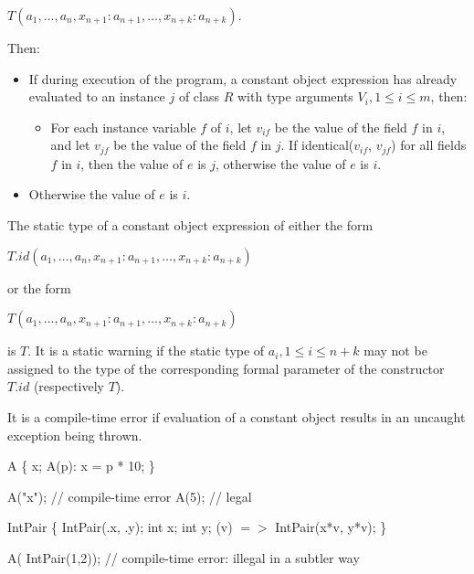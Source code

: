 \documentclass{article}
\newcommand{\code}[1]{{\sf #1}}
\begin{document}
\NEW{} $T(a_1, \ldots , a_n, x_{n+1}: a_{n+1}, \ldots , x_{n+k}: a_{n+k})$. 

\LMHash{}
Then:
\begin{itemize}
\item If during execution of the program, a constant object expression has already evaluated to an instance $j$ of class $R$ with type arguments $V_i, 1 \le i \le m$, then: 
\begin{itemize}
\item For each instance variable $f$ of $i$, let $v_{if}$ be the value of the field $f$ in $i$, and let $v_{jf}$ be the value of the field $f$ in $j$. If  \code{identical($v_{if}$, $v_{jf}$)} for all fields $f$ in $i$, then the value of $e$ is $j$, otherwise the value of $e$ is $i$.
\end{itemize}
\item Otherwise the value of $e$ is $i$.
\end{itemize}


\LMHash{}
The static type of a constant object expression of either the form 

\CONST{} $T.id(a_1, \ldots , a_n, x_{n+1}: a_{n+1}, \ldots , x_{n+k}: a_{n+k})$ 

or the form  

\CONST{} $T(a_1, \ldots , a_n, x_{n+1}: a_{n+1}, \ldots , x_{n+k}: a_{n+k})$ 

is $T$. It is a static warning if the static type of $a_i, 1 \le i \le n+ k$ may not be assigned to the type of the corresponding formal parameter of the constructor $T.id$ (respectively $T$).

\LMHash{}
It is a compile-time error if evaluation of a constant object results in an uncaught exception being thrown.


\begin{dartCode}
\CLASS{} A \{
   \FINAL{}  x;
   \CONST{} A(p): x = p * 10;
\}

\CONST{} A("x"); // compile-time error
\CONST{} A(5); // legal


\CLASS{} IntPair \{
 \CONST{} IntPair(\THIS{}.x, \THIS{}.y);
 \FINAL{} int x;
 \FINAL{} int y;
 \OPERATOR *(v) $=>$ \NEW{} IntPair(x*v, y*v);
\}

\CONST{} A(\CONST{} IntPair(1,2)); // compile-time error: illegal in a subtler way
\end{dartCode}
\end{document}
